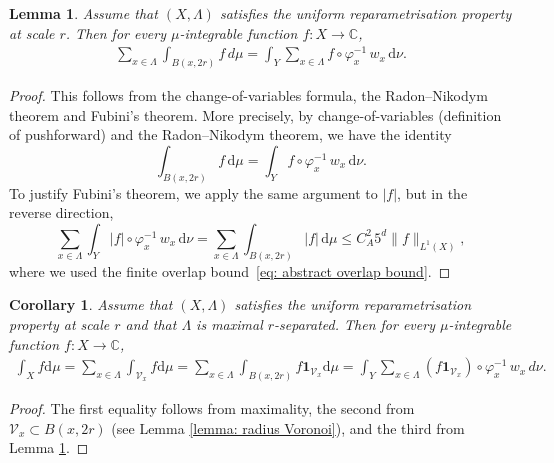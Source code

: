 \documentclass[12pt,reqno]{amsart}
\newtheorem{lemma}[theorem]{Lemma}
\newtheorem{corollary}[theorem]{Corollary}
\theoremstyle{definition}
\theoremstyle{remark}
\numberwithin{equation}{section}
\newcommand{\1}{\mathbbm{1}}
\newcommand{\C}{\mathbb{C}}
\renewcommand{\phi}{\varphi}
\def\rd{\mathrm{d}}
\begin{document}
\begin{lemma}\label{lem: Fubini reparametrisation}
  Assume that $(X,\Lambda)$ satisfies the uniform reparametrisation property at scale $r$. Then for every $\mu$-integrable function $f:X\to\C$,
  \begin{align}\label{eq: change of variables formula}
    \sum_{x\in\Lambda} \int_{B(x,2r)} f \, d\mu
    = \int_{Y} \sum_{x\in\Lambda} f\circ \phi_x^{-1} \, w_x\, \rd\nu.
  \end{align}
\end{lemma}

\begin{proof}
  This follows from the change-of-variables formula, the Radon–Nikodym theorem and Fubini's theorem. More precisely, by change-of-variables (definition of pushforward) and the Radon–Nikodym theorem, we have the identity
  \[
    \int_{B(x,2r)} f\,\rd\mu
    = \int_{Y} f\circ \phi_x^{-1} \, w_x\, \rd\nu.
  \]
  To justify Fubini's theorem, we apply the same argument to $|f|$, but in the reverse direction,
  \[
    \sum_{x\in\Lambda}\int_{Y} |f|\circ \phi_x^{-1} \, w_x\, \rd\nu
    = \sum_{x\in\Lambda}\int_{B(x,2r)} |f|\,\rd\mu\leq C_A^2 5^d\|f\|_{L^1(X)},
  \]
  where we used the finite overlap bound~\eqref{eq: abstract overlap bound}.
\end{proof}

\begin{corollary}
Assume that $(X,\Lambda)$ satisfies the uniform reparametrisation property at scale $r$ and that $\Lambda$ is maximal $r$-separated. Then for every $\mu$-integrable function $f:X\to\C$,
  \begin{align}\label{eq: change of variables formula 2}
    \int_X f\rd\mu=\sum_{x\in \Lambda}\int_{\mathcal{V}_x}f\rd\mu
    = \sum_{x\in \Lambda}\int_{B(x,2r)}f\mathbf{1}_{\mathcal{V}_x}\rd\mu
    = \int_{Y} \sum_{x\in\Lambda} (f \mathbf{1}_{\mathcal{V}_x})\circ \phi_x^{-1} \, w_x\, d\nu.
  \end{align}
\end{corollary}

\begin{proof}
    The first equality follows from maximality, the second from $\mathcal{V}_x\subset B(x,2r)$ (see Lemma \ref{lemma: radius Voronoi}), and the third from Lemma \ref{lem: Fubini reparametrisation}.
\end{proof}
\end{document}
